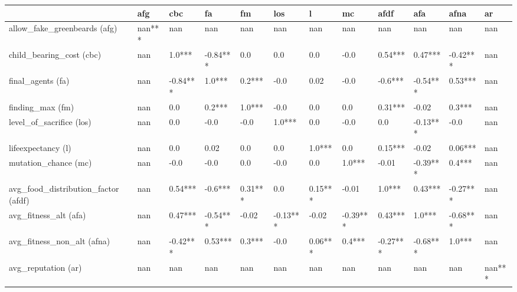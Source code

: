 \begin{tabular}{llllllllllll}
    \toprule
    {}                                     & afg    & cbc      & fa       & fm      & los      & l       & mc       & afdf     & afa      & afna     & ar     \\
    \midrule
    allow\_fake\_greenbeards (afg)         & nan*** & nan      & nan      & nan     & nan      & nan     & nan      & nan      & nan      & nan      & nan    \\
    child\_bearing\_cost (cbc)             & nan    & 1.0***   & -0.84*** & 0.0     & 0.0      & 0.0     & -0.0     & 0.54***  & 0.47***  & -0.42*** & nan    \\
    final\_agents (fa)                     & nan    & -0.84*** & 1.0***   & 0.2***  & -0.0     & 0.02    & -0.0     & -0.6***  & -0.54*** & 0.53***  & nan    \\
    finding\_max (fm)                      & nan    & 0.0      & 0.2***   & 1.0***  & -0.0     & 0.0     & 0.0      & 0.31***  & -0.02    & 0.3***   & nan    \\
    level\_of\_sacrifice (los)             & nan    & 0.0      & -0.0     & -0.0    & 1.0***   & 0.0     & -0.0     & 0.0      & -0.13*** & -0.0     & nan    \\
    lifeexpectancy (l)                     & nan    & 0.0      & 0.02     & 0.0     & 0.0      & 1.0***  & 0.0      & 0.15***  & -0.02    & 0.06***  & nan    \\
    mutation\_chance (mc)                  & nan    & -0.0     & -0.0     & 0.0     & -0.0     & 0.0     & 1.0***   & -0.01    & -0.39*** & 0.4***   & nan    \\
    avg\_food\_distribution\_factor (afdf) & nan    & 0.54***  & -0.6***  & 0.31*** & 0.0      & 0.15*** & -0.01    & 1.0***   & 0.43***  & -0.27*** & nan    \\
    avg\_fitness\_alt (afa)                & nan    & 0.47***  & -0.54*** & -0.02   & -0.13*** & -0.02   & -0.39*** & 0.43***  & 1.0***   & -0.68*** & nan    \\
    avg\_fitness\_non\_alt (afna)          & nan    & -0.42*** & 0.53***  & 0.3***  & -0.0     & 0.06*** & 0.4***   & -0.27*** & -0.68*** & 1.0***   & nan    \\
    avg\_reputation (ar)                   & nan    & nan      & nan      & nan     & nan      & nan     & nan      & nan      & nan      & nan      & nan*** \\
    \bottomrule
\end{tabular}
